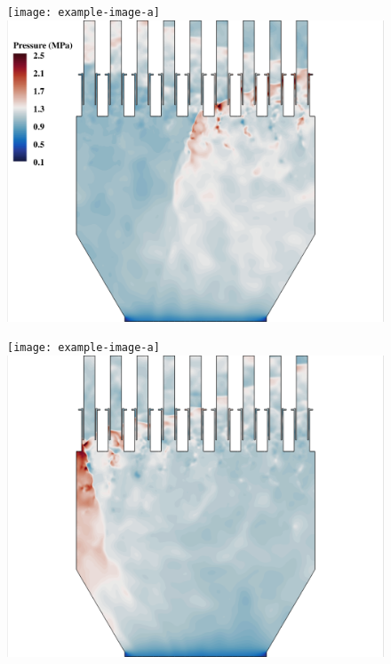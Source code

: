 \begin{figure}
	\begin{minipage}{0.49\linewidth}
		\ifdefined\DRAFT
			\texttt{[image: example-image-a]}
		\else
			\includegraphics[width=0.99\linewidth,trim={0.5em 0em 6cm 0em},clip]{Chapters/NineElement/Images/example_snaps/example_pressure_z.png}
		\fi
	\end{minipage}
	\begin{minipage}{0.49\linewidth}
		\ifdefined\DRAFT
			\texttt{[image: example-image-a]}
		\else
			\includegraphics[width=0.99\linewidth,trim={6cm 0em 0.5em 0em},clip]{Chapters/NineElement/Images/example_snaps/example_pressure_z_216000.png}
		\fi
	\end{minipage}


\end{figure}
